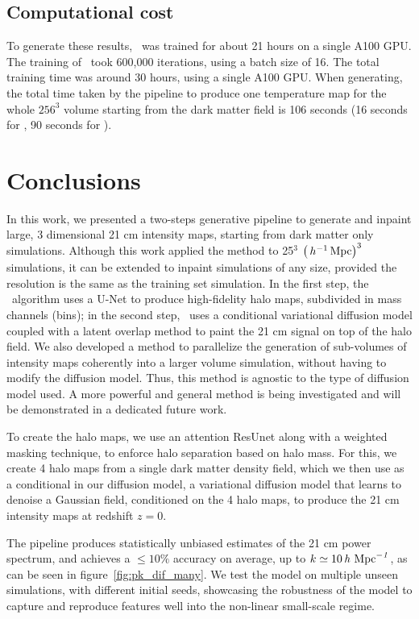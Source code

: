 \subsection{Computational cost}

To generate these results, \HALOgen~was trained for about 21 hours on a single A100 GPU. The training of \LODI\ took  600,000 iterations, using a batch size of 16. The total training time was around 30 hours, using a single A100 GPU.
When generating, the total time taken by the pipeline to produce one temperature map for the whole $256^3$ volume starting from the dark matter field is 106 seconds (16 seconds for \HALOgen, 90 seconds for \LODI).


\section{Conclusions}
\label{conclusions}
In this work, we presented a two-steps generative pipeline to generate and inpaint large, 3 dimensional 21 cm intensity maps, starting from dark matter only simulations. Although this work applied the method to  25$^3$ $\left(\,h^{-1}\,\mathrm{Mpc}\right)^3$ simulations, it can be extended to inpaint simulations of any size, provided the resolution is the same as the training set simulation. In the first step, the \HALOgen\  algorithm uses a U-Net to produce high-fidelity halo maps, subdivided in mass channels (bins); in the second step, \LODI\ uses a conditional variational diffusion model coupled with a latent overlap method to paint the 21 cm signal on top of the halo field. We also developed a method to parallelize the generation of sub-volumes of intensity maps coherently into a larger volume simulation, without having to modify the diffusion model. Thus, this method is agnostic to the type of diffusion model used. A more powerful and general method is being investigated and will be demonstrated in a dedicated future work.

To create the halo maps, we use an attention ResUnet along with a weighted masking technique, to enforce halo separation based on halo mass. For this, we create 4 halo maps from a single dark matter density field, which we then use as a conditional in our diffusion model, a variational diffusion model that learns to denoise a Gaussian field, conditioned on the 4 halo maps, to produce the 21 cm intensity maps at redshift $z=0$.

The pipeline produces statistically unbiased estimates of the 21 cm power spectrum, and achieves a $\leq 10\%$ accuracy on average, up to $k \simeq 10\,\it{h} ~\text{Mpc}^{-1}$, as can be seen in figure~\ref{fig:pk_dif_many}. We test the model on multiple unseen simulations, with different initial seeds, showcasing the robustness of the model to capture and reproduce features well into the non-linear small-scale regime.
\vspace{\baselineskip}

